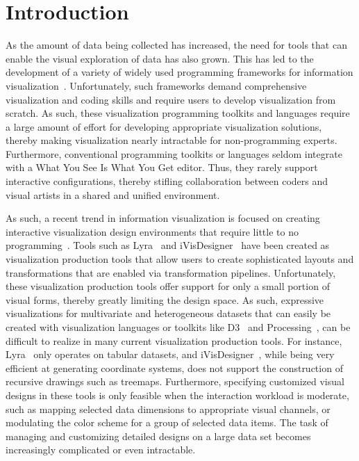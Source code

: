 \section{Introduction}
\label{sec:intro}
As the amount of data being collected has increased, the need for tools that can enable the visual exploration of data has also grown.  This has led to the development of a variety of widely used programming frameworks for information visualization~\cite{Flare,Processing,Heer:2009:TVCG,Heer:2011:TVCG,Heer:2010:TVCG,Heer:2005:CHI}.  Unfortunately, such frameworks demand comprehensive visualization and coding skills and require users to develop visualization from scratch. As such, these visualization programming toolkits and languages require a large amount of effort for developing appropriate visualization solutions, thereby making visualization nearly intractable for non-programming experts.  Furthermore, conventional programming toolkits or languages seldom integrate with a What You See Is What You Get editor. Thus, they rarely support interactive configurations, thereby stifling collaboration between coders and visual artists in a shared and unified environment.

As such, a recent trend in information visualization is focused on creating interactive visualization design environments that require little to no programming~\cite{Wijk:2011:TVCG,Victor}.  Tools such as Lyra~\cite{Heer:2014:CGF} and iVisDesigner~\cite{Yuan:2014:TVCG} have been created as visualization production tools that allow users to create sophisticated layouts and transformations that are enabled via transformation pipelines.  Unfortunately, these visualization production tools offer support for only a small portion of visual forms, thereby greatly limiting the design space.  As such, expressive visualizations for multivariate and heterogeneous datasets that can easily be created with visualization languages or toolkits like D3~\cite{Heer:2011:TVCG} and Processing~\cite{Processing}, can be difficult to realize in many current visualization production tools.  For instance, Lyra~\cite{Heer:2014:CGF} only operates on tabular datasets, and iVisDesigner~\cite{Yuan:2014:TVCG}, while being very efficient at generating coordinate systems, does not support the construction of recursive drawings such as treemaps.  Furthermore, specifying customized visual designs in these tools is only feasible when the interaction workload is moderate, such as mapping selected data dimensions to appropriate visual channels, or modulating the color scheme for a group of selected data items. The task of managing and customizing detailed designs on a large data set becomes increasingly complicated or even intractable.

